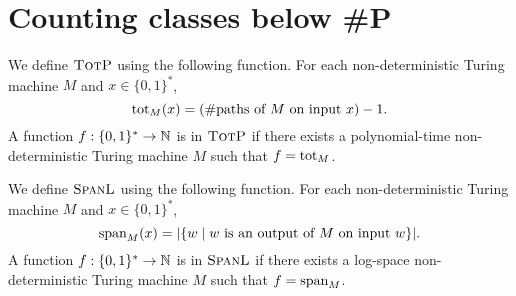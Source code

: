 \section{Counting classes below \#P}

We define $\totp$ using the following function. For each non-deterministic Turing machine $M$ and $x\in\{0,1\}^*$,
\[
	\tot_M(x) = (\text{\#paths of $M$ on input $x$}) - 1.
\]
A function $f:\{0,1\}^*\to\N$ is in $\totp$ if there exists a polynomial-time non-deterministic Turing machine $M$ such that $f = \tot_M$.

We define $\spanl$ using the following function. For each non-deterministic Turing machine $M$ and $x\in\{0,1\}^*$,
\[
	\sp_M(x) = \vert\{w \mid \text{$w$ is an output of $M$ on input $w$}\}\vert.
\]
A function $f:\{0,1\}^*\to\N$ is in $\spanl$ if there exists a log-space non-deterministic Turing machine $M$ such that $f = \sp_M$.

